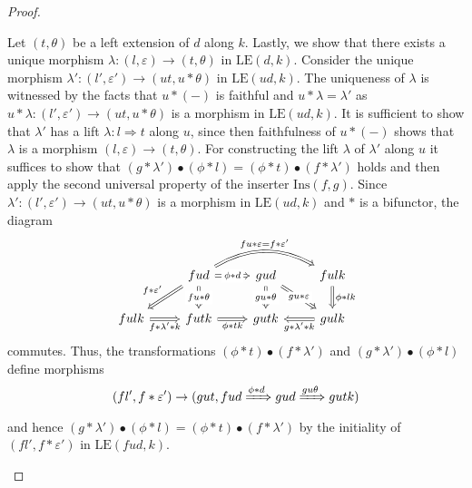 \documentclass[11pt]{article}
\theoremstyle{plain}
\theoremstyle{definition}
\numberwithin{equation}{section}
\newcommand{\Ins}{\mathrm{Ins}}
\newcommand{\LE}{\mathrm{LE}}
\begin{document}
\begin{proof}
\begin{enumerate}
       Let $(t,\theta)$ be a left extension of $d$ along $k$. Lastly, we show that there exists a unique morphism $\lambda\colon (l,\varepsilon)\to(t,\theta)$ in $\LE(d,k)$. Consider the unique morphism $\lambda'\colon (l',\varepsilon')\to (ut,u*\theta)$ in $\LE(ud, k)$. The uniqueness of $\lambda$ is witnessed by the facts that $u*(-)$ is faithful and $u*\lambda = \lambda'$ as $u*\lambda\colon (l',\varepsilon')\to (ut,u*\theta)$ is a morphism in $\LE(ud,k)$. It is sufficient to show that $\lambda'$ has a lift $\lambda\colon l\Rightarrow t$ along $u$, since then faithfulness of $u*(-)$ shows that $\lambda$ is a morphism $(l,\varepsilon)\to(t,\theta)$. For constructing the lift $\lambda$ of $\lambda'$ along $u$ it suffices to show that  $(g*\lambda')\bullet(\phi*l) = (\phi*t)\bullet(f*\lambda')$ holds and then apply the second universal property of the inserter $\Ins(f,g)$. Since $\lambda'\colon (l',\varepsilon')\to (ut,u*\theta)$ is a morphism in $\LE(ud,k)$ and $*$ is a bifunctor, the diagram
       $$
\begin{tikzcd}
                                           & fud \arrow[ld, "f*\varepsilon'"', Rightarrow] \arrow[d, "fu*\theta" description, Rightarrow] \arrow[r, "\phi*d" description, Rightarrow] \arrow[rr, "fu*\varepsilon = f*\varepsilon'", Rightarrow, bend left] & gud \arrow[rd, "gu*\varepsilon" description, Rightarrow] \arrow[d, "gu*\theta" description, Rightarrow] & fulk \arrow[d, "\phi*lk", Rightarrow]      \\
fulk \arrow[r, "f*\lambda'*k"', Rightarrow] & futk \arrow[r, "\phi*tk"', Rightarrow]                                                                                                                                                       & gutk                                                                                                    & gulk \arrow[l, "g*\lambda'*k", Rightarrow]
\end{tikzcd}        $$
       commutes. Thus, the transformations $(\phi*t)\bullet(f*\lambda')$ and $(g*\lambda')\bullet(\phi*l) $ define morphisms
       $$
       (fl',f*\varepsilon')\to (gut, fud\xRightarrow{\phi*d}gud\xRightarrow{gu\theta}gutk)
       $$
       and hence $(g*\lambda')\bullet(\phi*l) = (\phi*t)\bullet(f*\lambda')$ by the initiality of $(fl',f*\varepsilon')$ in $\LE(fud,k)$.


\end{enumerate}
\end{proof}
\end{document}
